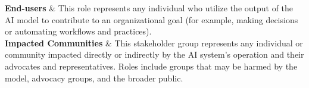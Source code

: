 \begin{table}[]
\begin{tabular}
\textbf{End-users}         &  This role represents any individual who utilize the output of the AI model to contribute to an organizational goal (for example, making decisions or automating workflows and practices).  \\ \midrule
\textbf{Impacted Communities} & This stakeholder group represents any individual or community impacted directly or indirectly by the AI system’s operation and their advocates and representatives. Roles include groups that may be harmed by the model, advocacy groups, and the broader public.    \\ \bottomrule
\end{tabular}
\label{tab:role_table}
\end{table}




